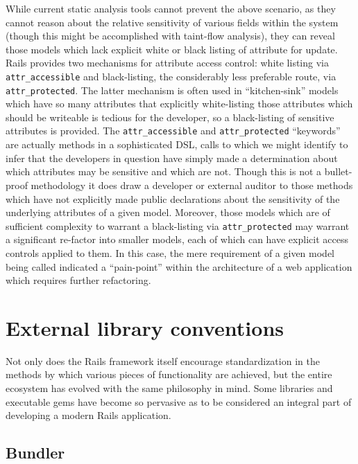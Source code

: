 \documentclass[conference]{IEEEtran}
\begin{document}
While current static analysis tools cannot prevent the above scenario, as they
cannot reason about the relative sensitivity of various fields within the system
(though this might be accomplished with taint-flow analysis), they can reveal
those models which lack explicit white or black listing of attribute for
update.  Rails provides two mechanisms for attribute access control: white
listing via \texttt{attr\_accessible} and black-listing, the considerably less
preferable route, via \texttt{attr\_protected}.  The latter mechanism is often used in
``kitchen-sink'' models which have so many attributes that explicitly
white-listing those attributes which should be writeable is tedious for the
developer, so a black-listing of sensitive attributes is provided.  The
\texttt{attr\_accessible} and \texttt{attr\_protected} ``keywords'' are actually methods
in a sophisticated DSL, calls to which we might identify to infer that the
developers in question have simply made a determination about which attributes
may be sensitive and which are not.  Though this is not a bullet-proof
methodology it does draw a developer or external auditor to those methods which
have not explicitly made public declarations about the sensitivity of the
underlying attributes of a given model.  Moreover, those models which are
of sufficient complexity to warrant a black-listing via \texttt{attr\_protected}
may warrant a significant re-factor into smaller models, each of which can have
explicit access controls applied to them.  In this case, the mere requirement of
a given model being called indicated a ``pain-point'' within the architecture of
a web application which requires further refactoring.

\section{External library conventions}

Not only does the Rails framework itself encourage standardization in the
methods by which various pieces of functionality are achieved, but the entire
ecosystem has evolved with the same philosophy in mind.  Some libraries and
executable gems have become so pervasive as to be considered an integral part of
developing a modern Rails application.

\subsection{Bundler}
\end{document}
